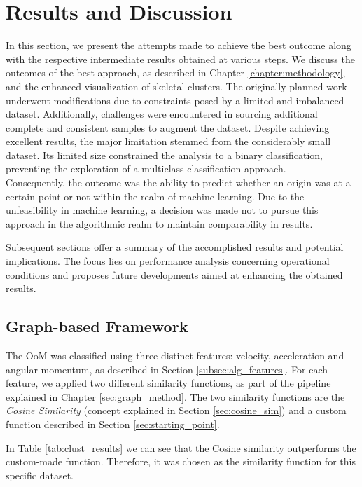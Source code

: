 \chapter{Results and Discussion}
\label{chapter:results}
In this section, we present the attempts made to achieve the best outcome along with the respective intermediate results obtained at various steps.
We discuss the outcomes of the best approach, as described in Chapter \ref{chapter:methodology}, and the enhanced visualization of skeletal clusters. The originally planned work underwent modifications due to constraints posed by a limited and imbalanced dataset. 
Additionally, challenges were encountered in sourcing additional complete and consistent samples to augment the dataset.
Despite achieving excellent results, the major limitation stemmed from the considerably small dataset. 
Its limited size constrained the analysis to a binary classification, preventing the exploration of a multiclass classification approach. \\
Consequently, the outcome was the ability to predict whether an origin was at a certain point or not within the realm of machine learning. 
Due to the unfeasibility in machine learning, a decision was made not to pursue this approach in the algorithmic realm to maintain comparability in results. 

Subsequent sections offer a summary of the accomplished results and potential implications. The focus lies on performance analysis concerning operational conditions and proposes future developments aimed at enhancing the obtained results.
\section{Graph-based Framework}
The OoM was classified using three distinct features: velocity, acceleration and angular momentum, as described in Section \ref{subsec:alg_features}.
For each feature, we applied two different similarity functions, as part of the pipeline explained in Chapter \ref{sec:graph_method}.
The two similarity functions are the \textit{Cosine Similarity} (concept explained in Section \ref{sec:cosine_sim}) and a custom function described in Section \ref{sec:starting_point}.

In Table \ref{tab:clust_results} we can see that the Cosine similarity outperforms the custom-made function. 
Therefore, it was chosen as the similarity function for this specific dataset.

